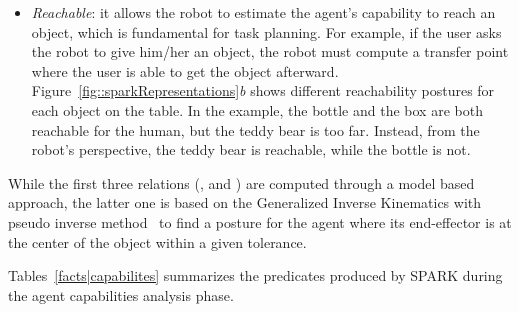 \begin{itemize}
\item \emph{Reachable}: it allows the robot to estimate the agent's capability
to reach an object, which is fundamental for task planning. For example, if the
user asks the robot to give him/her an object, the robot must compute a transfer
point where the user is able to get the object afterward. 
Figure~\ref{fig::sparkRepresentations}\emph{b} shows different reachability postures for each object
on the table. In the example, the bottle and the box are both reachable for the
human, but the teddy bear is too far. Instead, from the robot's perspective,
the teddy bear is reachable, while the bottle is not.

\end{itemize}

\begin{figure*}[!t]
	\begin{center}
	\caption{(a) Field of view (FOV) and the field of attention (FOA) of the human. (b) Different reaching postures for the human.}
	\label{fig::sparkRepresentations}
	\end{center}
\end{figure*} 


While the first three relations (,  and
) are computed through a model based approach, the latter one
is based on the Generalized Inverse Kinematics with pseudo inverse
method~\cite{Nakamura90,Baerlocher04} to find a posture for the
agent where its end-effector is at the center of the object within a given
tolerance.

Tables~\ref{facts|capabilites} summarizes the predicates produced by SPARK
during the agent capabilities analysis phase.

